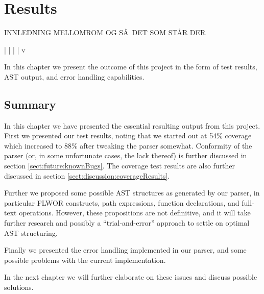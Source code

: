 \chapter{Results}
\label{chapter:results}

INNLEDNING
MELLOMROM
OG S\AA~DET SOM ST\AA R DER

|
|
|
|
v

In this chapter we present the outcome of this project in the form of test
results, AST output, and error handling capabilities.





\section{Summary}
In this chapter we have presented the essential resulting output from this
project. First we presented our test results, noting that we started out at   
54\% coverage which increased to 88\% after tweaking the parser somewhat.
Conformity of the parser (or, in some unfortunate cases, the lack thereof) is
further  discussed in section \ref{sect:future:knownBugs}. The coverage test
results are also further discussed in section
\ref{sect:discussion:coverageResults}.

Further we proposed some possible AST structures as generated by our parser, in
particular FLWOR constructs, path expressions, function declarations, and
full-text operations. However, these propositions are not definitive, and it
will take further research and possibly a ``trial-and-error'' approach to settle
on optimal AST structuring.

Finally we presented the error handling implemented in our parser, and some
possible problems with the current implementation. 

In the next chapter we will further elaborate on these issues and discuss
possible solutions.